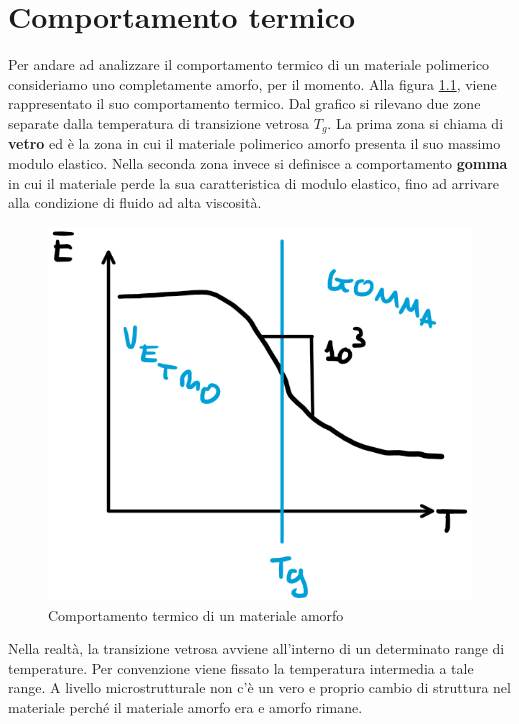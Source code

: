 \chapter{Comportamento termico}\label{chp:ComportamentoTermico}
Per andare ad analizzare il comportamento termico di un materiale polimerico consideriamo uno completamente amorfo, per il momento. 
Alla figura \ref{fig:Tg}, viene rappresentato il suo comportamento termico.
Dal grafico si rilevano due zone separate dalla temperatura di transizione vetrosa $T_g$.
La prima zona si chiama di \textbf{vetro} ed è la zona in cui il materiale polimerico amorfo presenta il suo massimo modulo elastico.
Nella seconda zona invece si definisce a comportamento \textbf{gomma} in cui il materiale perde la sua caratteristica di modulo elastico, fino ad arrivare alla condizione di fluido ad alta viscosità.

\begin{figure}
\centering
\includegraphics[width = \textwidth]{gfx/Tg}
\caption{Comportamento termico di un materiale amorfo}
\label{fig:Tg}
\end{figure}


Nella realtà, la transizione vetrosa avviene all'interno di un determinato range di temperature. Per convenzione viene fissato la temperatura intermedia a tale range.
A livello microstrutturale non c'è un vero e proprio cambio di struttura nel materiale perché il materiale amorfo era e amorfo rimane.

